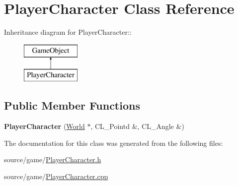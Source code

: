 \hypertarget{classPlayerCharacter}{
\section{PlayerCharacter Class Reference}
\label{classPlayerCharacter}
}
Inheritance diagram for PlayerCharacter::\begin{figure}[H]
\begin{center}
\leavevmode
\includegraphics[height=2cm]{classPlayerCharacter}
\end{center}
\end{figure}
\subsection*{Public Member Functions}
\begin{DoxyCompactItemize}
\item 
\hypertarget{classPlayerCharacter_a0207723ef3dc387dcf80b01839715d31}{
{\bfseries PlayerCharacter} (\hyperlink{classWorld}{World} $\ast$, CL\_\-Pointd \&, CL\_\-Angle \&)}
\label{classPlayerCharacter_a0207723ef3dc387dcf80b01839715d31}

\end{DoxyCompactItemize}


The documentation for this class was generated from the following files:\begin{DoxyCompactItemize}
\item 
source/game/\hyperlink{PlayerCharacter_8h}{PlayerCharacter.h}\item 
source/game/\hyperlink{PlayerCharacter_8cpp}{PlayerCharacter.cpp}\end{DoxyCompactItemize}
